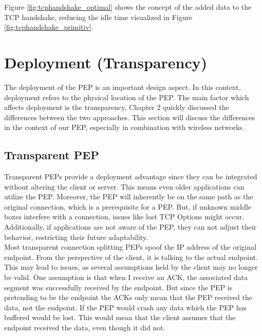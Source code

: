 \documentclass[a4paper,english, 11pt]{report}
\begin{document}
Figure \ref{fig:tcphandshake_optimal} shows the concept of the added data to the TCP handshake, reducing the idle time visualized in Figure \ref{fig:tcphandshake_primitiv}. 


\section{Deployment (Transparency)}
The deployment of the PEP is an important design aspect. In this context, deployment refers to the physical location of the PEP. The main factor which affects deployment is the transparency, Chapter 2 quickly discussed the differences between the two approaches. This section will discuss the differences in the context of our PEP, especially in combination with wireless networks.

\subsection{Transparent PEP}
Transparent PEPs provide a deployment advantage since they can be integrated without altering the client or server. This means even older applications can utilize the PEP. Moreover, the PEP will inherently be on the same path as the original connection, which is a prerequisite for a PEP. But, if unknown middle boxes interfere with a connection, issues like lost TCP Options might occur. Additionally, if applications are not aware of the PEP, they can not adjust their behavior, restricting their future adaptability.\\

Most transparent connection splitting PEPs spoof the IP address of the original endpoint. From the perspective of the client, it is talking to the actual endpoint. This may lead to issues, as several assumptions held by the client may no longer be valid. One assumption is that when I receive an ACK, the associated data segment was successfully received by the endpoint. But since the PEP is pretending to be the endpoint the ACKs only mean that the PEP received the data, not the endpoint. If the PEP would crash any data which the PEP has buffered would be lost. This would mean that the client assumes that the endpoint received the data, even though it did not.
\end{document}
